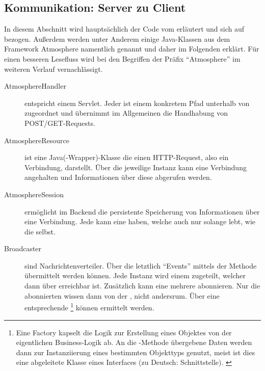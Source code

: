 \subsection{Kommunikation: Server zu Client}
\label{sub:Kommunikation: Server zu Client}
In diesem Abschnitt wird hauptsächlich der Code vom  erläutert und sich
auf  bezogen. Außerdem werden unter Anderem einige Java-Klassen aus dem Framework Atmosphere namentlich
genannt und daher im Folgenden erklärt. Für einen besseren Lesefluss wird bei den Begriffen der Präfix "`Atmosphere"' im weiteren
Verlauf vernachlässigt.
\begin{description}
	\item [AtmosphereHandler] entspricht einem Servlet. Jeder  ist einem konkretem Pfad unterhalb von
	 zugeordnet und übernimmt im Allgemeinen die Handhabung von POST/GET-Requests. 
	\item [AtmosphereResource] ist eine Java(-Wrapper)-Klasse die einen HTTP-Request, also ein Verbindung, darstellt. Über die
	jeweilige Instanz kann eine Verbindung \zB angehalten und Informationen über diese abgerufen werden.
	\item [AtmosphereSession] ermöglicht im Backend die persistente Speicherung von Informationen über eine Verbindung. Jede
	 kann eine  haben, welche auch nur solange lebt, wie die
	 selbst.
	\item [Broadcaster] sind Nachrichtenverteiler. Über die letztlich "`Events"' mittels der Methode  übermittelt
	werden können. Jede  Instanz wird einem  zugeteilt, welcher dann \zB über
	 erreichbar ist. Zusätzlich kann eine  mehrere
	 abonnieren. Nur die abonnierten  wissen dann von der , nicht
	andersrum. Über eine entsprechende \sog {}\footnote{Eine Factory kapselt die Logik zur Erstellung eines Objektes von
	der eigentlichen Business-Logik ab. An die -Methode übergebene Daten werden dann zur Instanziierung eines
	bestimmten Objekttyps genutzt, meist ist dies eine abgeleitete Klasse \zB eines Interfaces (zu Deutsch: Schnittstelle).
	\citep[vgl.][]{Factory}} können  ermittelt werden.
\end{description}

